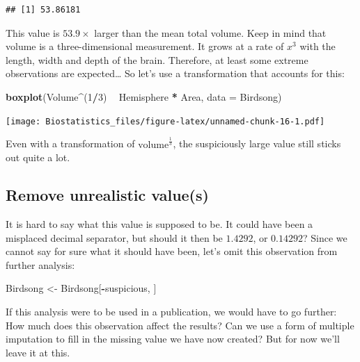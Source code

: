 \documentclass[
]{book}
\newenvironment{Shaded}{\begin{snugshade}}{\end{snugshade}}
\newcommand{\DataTypeTok}[1]{\textcolor[rgb]{0.13,0.29,0.53}{#1}}
\newcommand{\DecValTok}[1]{\textcolor[rgb]{0.00,0.00,0.81}{#1}}
\newcommand{\KeywordTok}[1]{\textcolor[rgb]{0.13,0.29,0.53}{\textbf{#1}}}
\newcommand{\NormalTok}[1]{#1}
\newcommand{\OperatorTok}[1]{\textcolor[rgb]{0.81,0.36,0.00}{\textbf{#1}}}
\newcommand{\StringTok}[1]{\textcolor[rgb]{0.31,0.60,0.02}{#1}}
\begin{document}
\begin{verbatim}
## [1] 53.86181
\end{verbatim}

This value is \(53.9 \times\) larger than the mean total volume. Keep in mind that volume is a three-dimensional measurement. It grows at a rate of \(x^3\) with the length, width and depth of the brain. Therefore, at least some extreme observations are expected\ldots{} So let's use a transformation that accounts for this:

\begin{Shaded}
\begin{Highlighting}[]
\KeywordTok{boxplot}\NormalTok{(Volume}\OperatorTok{^}\NormalTok{(}\DecValTok{1}\OperatorTok{/}\DecValTok{3}\NormalTok{) }\OperatorTok{~}\StringTok{ }\NormalTok{Hemisphere }\OperatorTok{*}\StringTok{ }\NormalTok{Area, }\DataTypeTok{data =}\NormalTok{ Birdsong)}
\end{Highlighting}
\end{Shaded}

\texttt{[image: Biostatistics\_files/figure-latex/unnamed-chunk-16-1.pdf]}

Even with a transformation of \(\text{volume}^\frac{1}{3}\), the suspiciously large value still sticks out quite a lot.

\hypertarget{remove-unrealistic-values}{%
\subsection{Remove unrealistic value(s)}\label{remove-unrealistic-values}}

It is hard to say what this value is supposed to be. It could have been a misplaced decimal separator, but should it then be \(1.4292\), or \(0.14292\)? Since we cannot say for sure what it should have been, let's omit this observation from further analysis:

\begin{Shaded}
\begin{Highlighting}[]
\NormalTok{Birdsong <-}\StringTok{ }\NormalTok{Birdsong[}\OperatorTok{-}\NormalTok{suspicious, ]}
\end{Highlighting}
\end{Shaded}

If this analysis were to be used in a publication, we would have to go further: How much does this observation affect the results? Can we use a form of multiple imputation to fill in the missing value we have now created? But for now we'll leave it at this.
\end{document}
